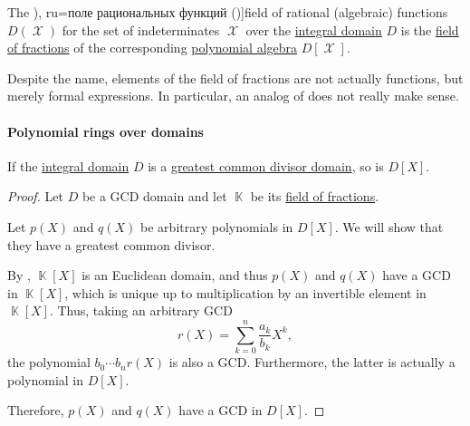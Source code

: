 \begin{definition}\label{def:rational_function_field}
  The \term[bg=поле на рационалните функции (\cite[360]{ГеновИПр1991Алгебра}), ru=поле рациональных функций (\cite[18]{Шафаревич1999Алгебра})]{field of rational (algebraic) functions} \( D(\mscrX) \) for the set of indeterminates \( \mscrX \) over the \hyperref[def:integral_domain]{integral domain} \( D \) is the \hyperref[thm:field_of_fractions]{field of fractions} of the corresponding \hyperref[def:polynomial_algebra]{polynomial algebra} \( D[\mscrX] \).
\end{definition}
\begin{comments}
  \item Despite the name, elements of the field of fractions are not actually functions, but merely formal expressions. In particular, an analog of  does not really make sense.
\end{comments}

\paragraph{Polynomial rings over domains}

\begin{proposition}\label{thm:polynomial_ring_over_gcd_domain}
  If the \hyperref[def:integral_domain]{integral domain} \( D \) is a \hyperref[def:gcd_domain]{greatest common divisor domain}, so is \( D[X] \).
\end{proposition}
\begin{proof}
  Let \( D \) be a GCD domain and let \( \BbbK \) be its \hyperref[thm:field_of_fractions]{field of fractions}.

  Let \( p(X) \) and \( q(X) \) be arbitrary polynomials in \( D[X] \). We will show that they have a greatest common divisor.

  By , \( \BbbK[X] \) is an Euclidean domain, and thus \( p(X) \) and \( q(X) \) have a GCD in \( \BbbK[X] \), which is unique up to multiplication by an invertible element in \( \BbbK[X] \). Thus, taking an arbitrary GCD
  \begin{equation*}
    r(X) = \sum_{k=0}^n \frac {a_k} {b_k} X^k,
  \end{equation*}
  the polynomial \( b_0 \cdots b_n r(X) \) is also a GCD. Furthermore, the latter is actually a polynomial in \( D[X] \).

  Therefore, \( p(X) \) and \( q(X) \) have a GCD in \( D[X] \).
\end{proof}

